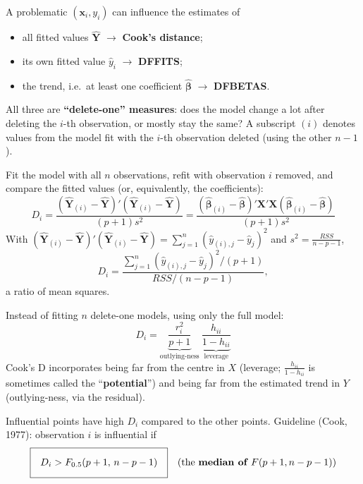 \begin{remark}
    A problematic $(\mathbf{x}_i,y_i)$ can influence the estimates of
    \begin{itemize}
        \item all fitted values $\hat{\mathbf{Y}}$ $\to$ \textbf{Cook's distance};
        \item its own fitted value $\hat y_i$ $\to$ \textbf{DFFITS};
        \item the trend, i.e.\ at least one coefficient $\hat{\boldsymbol\beta}$ $\to$ \textbf{DFBETAS}.
    \end{itemize}
    All three are \textbf{``delete-one'' measures}: does the model change a lot after deleting
    the $i$-th observation, or mostly stay the same? A subscript $(i)$ denotes values from the
    model fit with the $i$-th observation deleted (using the other $n-1$).
\end{remark}

\begin{definition}
    Fit the model with all $n$ observations, refit with observation $i$ removed, and compare
    the fitted values (or, equivalently, the coefficients):
    \[\boxed{D_i=\frac{(\hat{\mathbf{Y}}_{(i)}-\hat{\mathbf{Y}})'(\hat{\mathbf{Y}}_{(i)}-\hat{\mathbf{Y}})}{(p+1)s^2}}
    =\frac{(\hat{\boldsymbol\beta}_{(i)}-\hat{\boldsymbol\beta})'\mathbf{X}'\mathbf{X}(\hat{\boldsymbol\beta}_{(i)}-\hat{\boldsymbol\beta})}{(p+1)s^2}\]
    With $(\hat{\mathbf{Y}}_{(i)}-\hat{\mathbf{Y}})'(\hat{\mathbf{Y}}_{(i)}-\hat{\mathbf{Y}})=\sum_{j=1}^n(\hat y_{(i),j}-\hat y_j)^2$
    and $s^2=\frac{RSS}{n-p-1}$,
    \[D_i=\frac{\sum_{j=1}^n(\hat y_{(i),j}-\hat y_j)^2/(p+1)}{RSS/(n-p-1)},\]
    a ratio of mean squares.
\end{definition}

\begin{proposition}
    Instead of fitting $n$ delete-one models, using only the full model:
    \[\boxed{D_i=\underbrace{\frac{r_i^2}{p+1}}_{\text{outlying-ness}}\ \underbrace{\frac{h_{ii}}{1-h_{ii}}}_{\text{leverage}}}\]
    Cook's D incorporates being far from the centre in $X$ (leverage; $\frac{h_{ii}}{1-h_{ii}}$
    is sometimes called the ``\textbf{potential}'') and being far from the estimated trend in $Y$
    (outlying-ness, via the residual).
\end{proposition}

\begin{definition}
    Influential points have high $D_i$ compared to the other points. Guideline (Cook, 1977):
    observation $i$ is influential if
    \[\boxed{D_i>F_{0.5}(p+1,\,n-p-1)}\quad\text{(the \textbf{median of $F(p+1,n-p-1)$})}\]
\end{definition}

